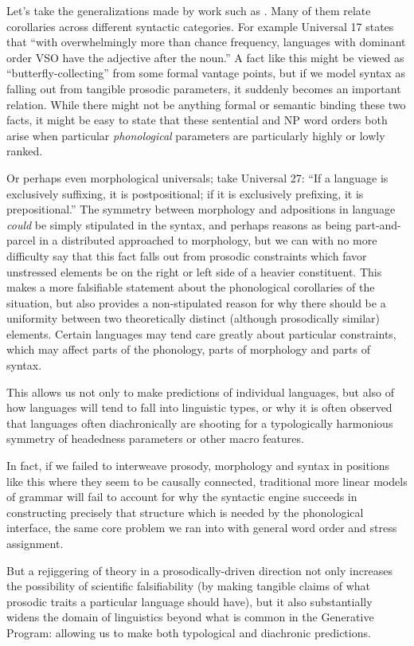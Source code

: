 \documentclass{article}
\begin{document}
Let's take the generalizations made by work such as \textcite{greenberg63}.
Many of them relate corollaries across different syntactic categories.
For example Universal 17 states that ``with overwhelmingly more than chance frequency, languages with dominant order VSO have the adjective after the noun.''
A fact like this might be viewed as ``butterfly-collecting'' from some formal vantage points, but if we model syntax as falling out from tangible prosodic parameters, it suddenly becomes an important relation.
While there might not be anything formal or semantic binding these two facts, it might be easy to state that these sentential and NP word orders both arise when particular \textit{phonological} parameters are particularly highly or lowly ranked.

Or perhaps even morphological universals; take Universal 27: ``If a language is exclusively suffixing, it is postpositional; if it is exclusively prefixing, it is prepositional.''
The symmetry between morphology and adpositions in language \emph{could} be simply stipulated in the syntax, and perhaps reasons as being part-and-parcel in a distributed approached to morphology, but we can with no more difficulty say that this fact falls out from prosodic constraints which favor unstressed elements be on the right or left side of a heavier constituent.
This makes a more falsifiable statement about the phonological corollaries of the situation, but also provides a non-stipulated reason for why there should be a uniformity between two theoretically distinct (although prosodically similar) elements.
Certain languages may tend care greatly about particular constraints, which may affect parts of the phonology, parts of morphology and parts of syntax.

This allows us not only to make predictions of individual languages, but also of how languages will tend to fall into linguistic types, or why it is often observed that languages often diachronically are shooting for a typologically harmonious symmetry of headedness parameters or other macro features.

In fact, if we failed to interweave prosody, morphology and syntax in positions like this where they seem to be causally connected, traditional more linear models of grammar will fail to account for why the syntactic engine succeeds in constructing precisely that structure which is needed by the phonological interface, the same core problem we ran into with general word order and stress assignment.

But a rejiggering of theory in a prosodically-driven direction not only increases the possibility of scientific falsifiability (by making tangible claims of what prosodic traits a particular language should have), but it also substantially widens the domain of linguistics beyond what is common in the Generative Program: allowing us to make both typological and diachronic predictions.
\end{document}
